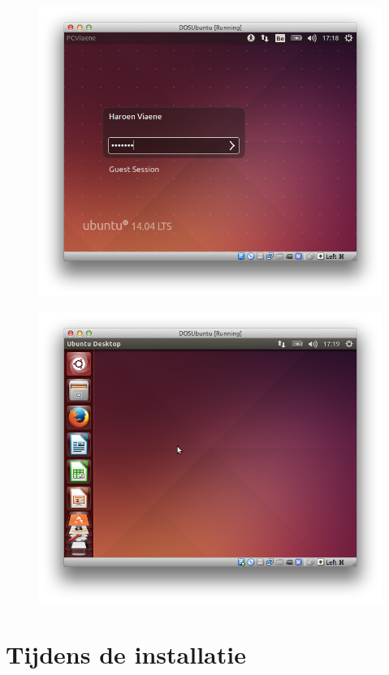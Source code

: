 \documentclass[11pt, a4paper]{article}
\begin{document}
\begin{figure}[H]
	\centering
	\includegraphics[width=\textwidth]{./IMG/X}
\end{figure}

\begin{figure}[H]
	\centering
	\includegraphics[width=\textwidth]{./IMG/Y}
\end{figure}

\section{Tijdens de installatie}
\end{document}
